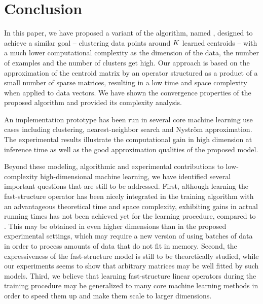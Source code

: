 \section{Conclusion}
\label{sec:conclusion}

In this paper, we have proposed a variant of the \kmeans algorithm, named \qkmeans, designed to achieve a similar goal -- clustering data points around $K$ learned centroids -- with a much lower computational complexity as the dimension of the data, the number of examples and the number of clusters get high. Our approach is based on the approximation of the centroid matrix by an operator structured as a product of a small number of sparse matrices, resulting in a low time and space complexity when applied to data vectors.
We have shown the convergence properties of the proposed algorithm and provided its complexity analysis.

An implementation prototype has been run in several core machine learning use cases including clustering, nearest-neighbor search and Nystr\"om approximation. The experimental results illustrate the computational gain in high dimension at inference time as well as the good approximation qualities of the proposed model.

Beyond these modeling, algorithmic and experimental contributions to low-complexity high-dimensional machine learning, we have identified several important questions that are still to be addressed.
First, although learning the fast-structure operator has been nicely integrated in the training algorithm with an advantageous theoretical time and space complexity, exhibiting gains in actual running times has not been achieved yet for the \qkmeans learning procedure, compared to \kmeans.
This may be obtained in even higher dimensions than in the proposed experimental settings, which may require a new version of \qkmeans using batches of data in order to process amounts of data that do not fit in memory.
Second, the expressiveness of the fast-structure model is still to be theoretically studied, while our experiments seems to show that arbitrary matrices may be well fitted by such models.
Third, we believe that learning fast-structure linear operators during the training procedure may be generalized to many core machine learning methods in order to speed them up and make them scale to larger dimensions.

